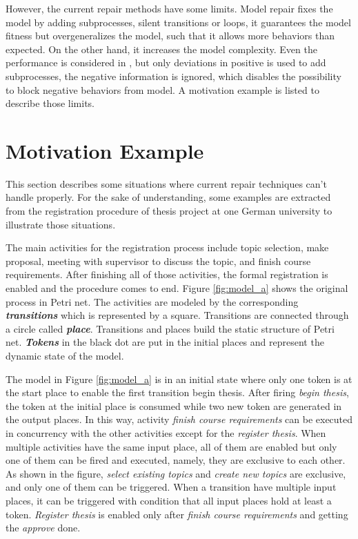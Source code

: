 However, the current repair methods have some limits. Model repair fixes the model by adding subprocesses, silent transitions or loops, it guarantees the model fitness but overgeneralizes the model, such that it allows more behaviors than expected. On the other hand, it increases the model complexity.  Even the performance is considered in \cite{dees2017enhancing}, but only deviations in positive is used to add subprocesses, the negative information is ignored, which disables the possibility to block negative behaviors from model.  A motivation example is listed to describe those limits.
\section{Motivation Example}
This section describes some situations where current repair techniques can't handle properly. For the sake of understanding, some examples are extracted from the registration procedure of thesis project at one German university to illustrate those situations. 

The main activities for the registration process include topic selection, make proposal, meeting with supervisor to discuss the topic, and finish course requirements. After finishing all of those activities, the formal registration is enabled and the procedure comes to end. Figure \ref{fig:model_a}  shows the original process in Petri net. The activities are modeled by the corresponding \textbf{\emph{transitions}} which is represented by a square. Transitions are connected through a circle called \textbf{\emph{place}}. Transitions and places build the static structure of Petri net. \textbf{\emph{Tokens}} in the black dot are put in the initial places and represent the dynamic state of the model. 

The model in Figure \ref{fig:model_a} is in an initial state where only one token is at the start place to enable the first transition begin thesis. After firing \emph{begin thesis}, the token at the initial place is consumed while two new token are generated in the output places. In this way, activity \emph{finish course requirements}  can be executed in concurrency with the other activities except for the \emph{register thesis}. When multiple activities have the same input place, all of them are enabled but only one of them can be fired and executed, namely, they are exclusive to each other. As shown in the figure,  \emph{select existing topics}  and \emph{create new topics} are exclusive, and only one of them can be triggered. When a transition have multiple input places, it can be triggered with condition that all input places hold at least a token. \emph{Register thesis} is enabled only after \emph{finish course requirements} and getting the \emph{approve} done. 

